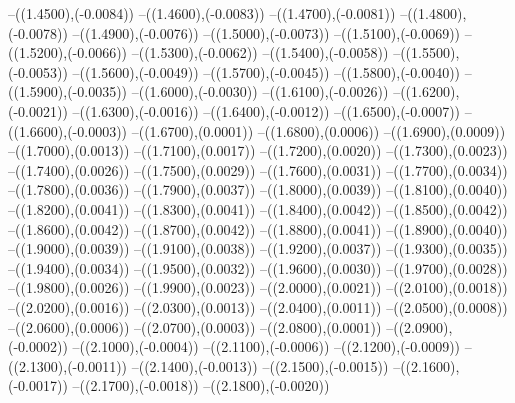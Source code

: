 {	--({\sx*(1.4500)},{\sy*(-0.0084)})
	--({\sx*(1.4600)},{\sy*(-0.0083)})
	--({\sx*(1.4700)},{\sy*(-0.0081)})
	--({\sx*(1.4800)},{\sy*(-0.0078)})
	--({\sx*(1.4900)},{\sy*(-0.0076)})
	--({\sx*(1.5000)},{\sy*(-0.0073)})
	--({\sx*(1.5100)},{\sy*(-0.0069)})
	--({\sx*(1.5200)},{\sy*(-0.0066)})
	--({\sx*(1.5300)},{\sy*(-0.0062)})
	--({\sx*(1.5400)},{\sy*(-0.0058)})
	--({\sx*(1.5500)},{\sy*(-0.0053)})
	--({\sx*(1.5600)},{\sy*(-0.0049)})
	--({\sx*(1.5700)},{\sy*(-0.0045)})
	--({\sx*(1.5800)},{\sy*(-0.0040)})
	--({\sx*(1.5900)},{\sy*(-0.0035)})
	--({\sx*(1.6000)},{\sy*(-0.0030)})
	--({\sx*(1.6100)},{\sy*(-0.0026)})
	--({\sx*(1.6200)},{\sy*(-0.0021)})
	--({\sx*(1.6300)},{\sy*(-0.0016)})
	--({\sx*(1.6400)},{\sy*(-0.0012)})
	--({\sx*(1.6500)},{\sy*(-0.0007)})
	--({\sx*(1.6600)},{\sy*(-0.0003)})
	--({\sx*(1.6700)},{\sy*(0.0001)})
	--({\sx*(1.6800)},{\sy*(0.0006)})
	--({\sx*(1.6900)},{\sy*(0.0009)})
	--({\sx*(1.7000)},{\sy*(0.0013)})
	--({\sx*(1.7100)},{\sy*(0.0017)})
	--({\sx*(1.7200)},{\sy*(0.0020)})
	--({\sx*(1.7300)},{\sy*(0.0023)})
	--({\sx*(1.7400)},{\sy*(0.0026)})
	--({\sx*(1.7500)},{\sy*(0.0029)})
	--({\sx*(1.7600)},{\sy*(0.0031)})
	--({\sx*(1.7700)},{\sy*(0.0034)})
	--({\sx*(1.7800)},{\sy*(0.0036)})
	--({\sx*(1.7900)},{\sy*(0.0037)})
	--({\sx*(1.8000)},{\sy*(0.0039)})
	--({\sx*(1.8100)},{\sy*(0.0040)})
	--({\sx*(1.8200)},{\sy*(0.0041)})
	--({\sx*(1.8300)},{\sy*(0.0041)})
	--({\sx*(1.8400)},{\sy*(0.0042)})
	--({\sx*(1.8500)},{\sy*(0.0042)})
	--({\sx*(1.8600)},{\sy*(0.0042)})
	--({\sx*(1.8700)},{\sy*(0.0042)})
	--({\sx*(1.8800)},{\sy*(0.0041)})
	--({\sx*(1.8900)},{\sy*(0.0040)})
	--({\sx*(1.9000)},{\sy*(0.0039)})
	--({\sx*(1.9100)},{\sy*(0.0038)})
	--({\sx*(1.9200)},{\sy*(0.0037)})
	--({\sx*(1.9300)},{\sy*(0.0035)})
	--({\sx*(1.9400)},{\sy*(0.0034)})
	--({\sx*(1.9500)},{\sy*(0.0032)})
	--({\sx*(1.9600)},{\sy*(0.0030)})
	--({\sx*(1.9700)},{\sy*(0.0028)})
	--({\sx*(1.9800)},{\sy*(0.0026)})
	--({\sx*(1.9900)},{\sy*(0.0023)})
	--({\sx*(2.0000)},{\sy*(0.0021)})
	--({\sx*(2.0100)},{\sy*(0.0018)})
	--({\sx*(2.0200)},{\sy*(0.0016)})
	--({\sx*(2.0300)},{\sy*(0.0013)})
	--({\sx*(2.0400)},{\sy*(0.0011)})
	--({\sx*(2.0500)},{\sy*(0.0008)})
	--({\sx*(2.0600)},{\sy*(0.0006)})
	--({\sx*(2.0700)},{\sy*(0.0003)})
	--({\sx*(2.0800)},{\sy*(0.0001)})
	--({\sx*(2.0900)},{\sy*(-0.0002)})
	--({\sx*(2.1000)},{\sy*(-0.0004)})
	--({\sx*(2.1100)},{\sy*(-0.0006)})
	--({\sx*(2.1200)},{\sy*(-0.0009)})
	--({\sx*(2.1300)},{\sy*(-0.0011)})
	--({\sx*(2.1400)},{\sy*(-0.0013)})
	--({\sx*(2.1500)},{\sy*(-0.0015)})
	--({\sx*(2.1600)},{\sy*(-0.0017)})
	--({\sx*(2.1700)},{\sy*(-0.0018)})
	--({\sx*(2.1800)},{\sy*(-0.0020)})
}
